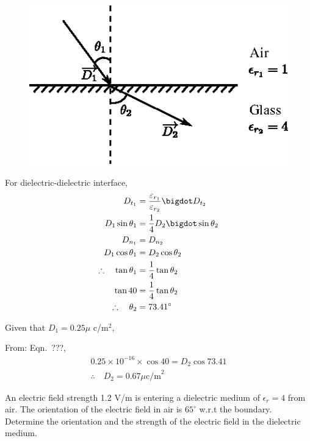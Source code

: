 \begin{solution}
~

\begin{figure}[H]
\centering
\includegraphics[scale=1.1]{images/fig4.eps}\label{chap27-fig4}
\end{figure}

For dielectric-dielectric interface,
\begin{align*}
D_{t_{1}} & = \dfrac{\varepsilon_{r_{1}}}{\varepsilon_{r_{2}}} \bigdot D_{t_{2}}\\
D_{1} \sin \theta_{1} & = \dfrac{1}{4} D_{2} \bigdot \sin \theta_{2}\\
D_{n_{1}} & = D_{n_{2}}\\
D_{1} \cos \theta_{1} & = D_{2} \cos \theta_{2}\\
\therefore\quad \tan \theta_{1} & = \dfrac{1}{4} \tan \theta_{2}\\
\tan 40 & = \dfrac{1}{4} \tan \theta_{2}\\
\therefore\quad \theta_{2} & = 73.41^{\circ}
\end{align*}

Given that $D_{1} = 0.25\mu$ c/m$^{2}$,

From: Eqn.~???, 
\begin{gather*}
0.25\times 10^{-16} \times \cos 40 = D_{2} \cos 73.41\\
\therefore\quad D_{2} = 0.67\mu \text{c/m}^{2}
\end{gather*}
\end{solution}

\begin{problem}
An electric field strength 1.2 V/m is entering a dielectric medium of $\epsilon_{r} = 4$ from air. The orientation of the electric field in air is $65^{\circ}$ w.r.t the boundary. Determine the orientation and the strength of the electric field in the dielectric medium. 
\end{problem}


